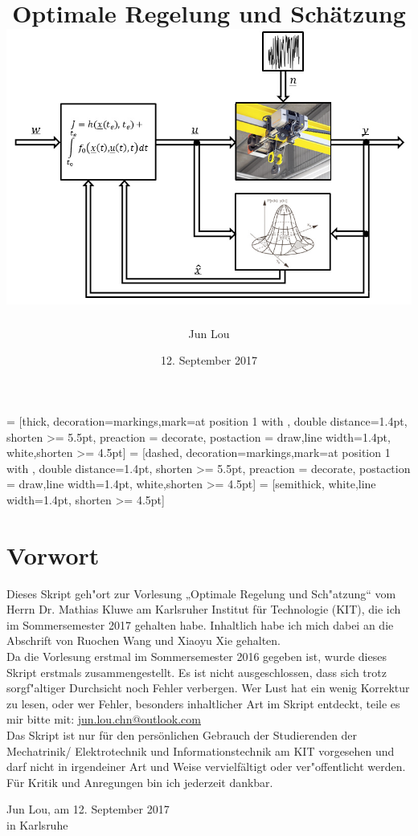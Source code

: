 \documentclass[openany,a4paper,11pt]{book}
\author{Jun Lou}
\date{12. September 2017}
\title{\Huge \textbf{Optimale Regelung und Schätzung} \\[2cm] \protect \includegraphics[width=\textwidth]{ors.png}}
\begin{document}

 = [thick, decoration={markings,mark=at position
1 with {}},
double distance=1.4pt, shorten >= 5.5pt,
preaction = {decorate},
postaction = {draw,line width=1.4pt, white,shorten >= 4.5pt}]
 = [dashed, decoration={markings,mark=at position
1 with {}},
double distance=1.4pt, shorten >= 5.5pt,
preaction = {decorate},
postaction = {draw,line width=1.4pt, white,shorten >= 4.5pt}]  
 = [semithick, white,line width=1.4pt, shorten >= 4.5pt]


\newcommand\encircle[1]{%
\tikz[baseline=(X.base)] \node (X) [draw, shape=circle, inner sep=0] {\strut #1};}

\pagestyle{plain}
\maketitle
\tableofcontents
\setcounter{page}{1}
\frontmatter
{}
\chapter*{Vorwort}   
Dieses Skript geh"ort zur Vorlesung „Optimale Regelung und Sch"atzung“ vom Herrn Dr. Mathias Kluwe am Karlsruher Institut für Technologie (KIT), die ich im Sommersemester 2017 gehalten habe. Inhaltlich habe ich mich dabei an die Abschrift von Ruochen Wang und Xiaoyu Xie gehalten. \\[5pt]
Da die Vorlesung erstmal im Sommersemester 2016 gegeben ist, wurde dieses Skript erstmals zusammengestellt. Es ist nicht
ausgeschlossen, dass sich trotz sorgf"altiger Durchsicht noch Fehler verbergen. Wer Lust hat ein wenig Korrektur zu lesen, oder wer Fehler, besonders inhaltlicher Art im Skript entdeckt, teile es mir bitte mit: {\color{blue}\href{mailto:jun.lou.chn@outlook.com}{jun.lou.chn@outlook.com}}\\[5pt]
Das Skript ist nur für den persönlichen Gebrauch der Studierenden der Mechatrinik/ Elektrotechnik und Informationstechnik am KIT vorgesehen und darf nicht in irgendeiner Art und Weise vervielfältigt oder ver"offentlicht werden. \\[5pt]
Für Kritik und Anregungen bin ich jederzeit dankbar.\\[6pt]
\begin{flushright} Jun Lou, am 12. September 2017\\
in Karlsruhe\end{flushright}
\setcounter{page}{1}
\mainmatter
\end{document}
